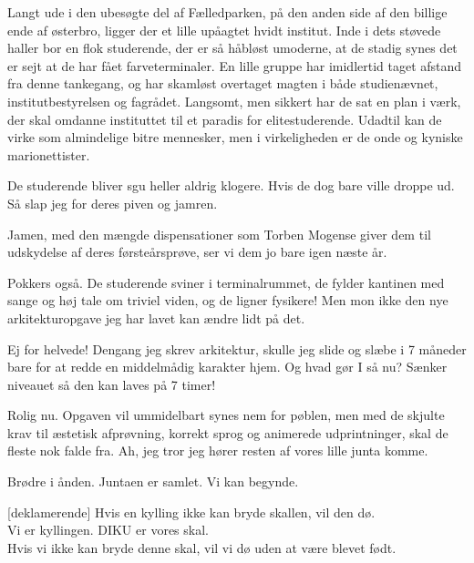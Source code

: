 \documentclass[a4paper,11pt]{article}
\begin{document}
\begin{sketch}
  
 Langt ude i den ubesøgte del af Fælledparken, på den anden
  side af den billige ende af østerbro, ligger der et lille upåagtet
  hvidt institut. Inde i dets støvede haller bor en flok studerende,
  der er så håbløst umoderne, at de stadig synes det er sejt at de har
  fået farveterminaler. En lille gruppe har imidlertid taget afstand
  fra denne tankegang, og har skamløst overtaget magten i både
  studienævnet, institutbestyrelsen og fagrådet. Langsomt, men sikkert
  har de sat en plan i værk, der skal omdanne instituttet til et
  paradis for elitestuderende. Udadtil kan de virke som almindelige
  bitre mennesker, men i virkeligheden er de onde og kyniske
  marionettister.


 De studerende bliver sgu heller aldrig klogere. Hvis de dog
bare ville droppe ud. Så slap jeg for deres piven og jamren.

 Jamen, med den mængde dispensationer som Torben Mogense
giver dem til udskydelse af deres førsteårsprøve, ser vi dem jo bare
igen næste år.

 Pokkers også. De studerende sviner i terminalrummet, de
fylder kantinen med sange og høj tale om triviel viden, og
 de ligner fysikere! Men mon ikke den nye
arkitekturopgave jeg har lavet kan ændre lidt på det.


 Ej for helvede! Dengang jeg skrev arkitektur, skulle jeg
slide og slæbe i 7 måneder bare for at redde en middelmådig karakter
hjem. Og hvad gør I så nu? Sænker niveauet så den kan laves på 7
timer!

 Rolig nu. Opgaven vil ummidelbart synes
nem for pøblen, men med de skjulte krav til æstetisk afprøvning,
korrekt sprog og animerede udprintninger, skal de fleste nok falde
fra. Ah, jeg tror jeg hører resten af vores lille junta komme.


 Brødre i ånden. Juntaen er samlet. Vi kan begynde.


[deklamerende] Hvis en kylling ikke kan bryde skallen, vil
den dø. \\ Vi er kyllingen. DIKU er vores skal.\\ Hvis vi ikke kan
bryde denne skal, vil vi dø uden at være blevet født.


\end{sketch}
\end{document}
